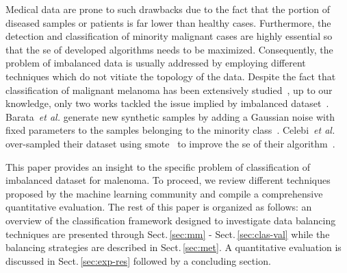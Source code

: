 Medical data are prone to such drawbacks due to the fact that the portion of diseased samples or patients is far lower than healthy cases.
Furthermore, the detection and classification of minority malignant cases are highly essential so that the \ac{se} of developed algorithms needs to be maximized.
Consequently, the problem of imbalanced data is usually addressed by employing different techniques which do not vitiate the topology of the data.
Despite the fact that classification of malignant melanoma has been extensively studied~\cite{rastgoo2015automatic}, up to our knowledge, only two works tackled the issue implied by imbalanced dataset~\cite{barata2013two,celebi2007methodological}.
Barata~\emph{et al.} generate new synthetic samples by adding a Gaussian noise with fixed parameters to the samples belonging to the minority class~\cite{barata2013two}.
Celebi~\emph{et al.} over-sampled their dataset using \ac{smote}~\cite{chawla2002smote} to improve the \ac{se} of their algorithm~\cite{celebi2007methodological}.

This paper provides an insight to the specific problem of classification of imbalanced dataset for malenoma. 
To proceed, we review different techniques proposed by the machine learning community and compile a comprehensive quantitative evaluation. 
The rest of this paper is organized as follows: an overview of the classification framework designed to investigate data balancing techniques are presented through Sect.\,\ref{sec:mm} - Sect.\,\ref{sec:clas-val} while the balancing strategies are described in Sect.\,\ref{sec:met}.
A quantitative evaluation is discussed in Sect.\,\ref{sec:exp-res} followed by a concluding section.




